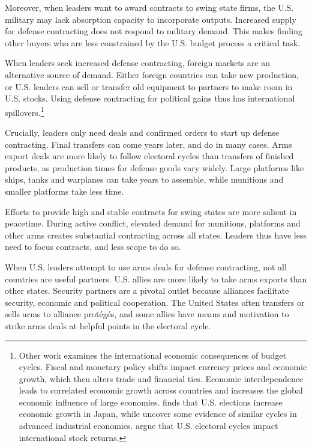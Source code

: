 \documentclass[12pt]{article}
\begin{document}
Moreover, when leaders want to award contracts to swing state firms, the U.S. military may lack absorption capacity to incorporate outputs.
Increased supply for defense contracting does not respond to military demand.
This makes finding other buyers who are less constrained by the U.S. budget process a critical task.


When leaders seek increased defense contracting, foreign markets are an alternative source of demand.
Either foreign countries can take new production, or U.S. leaders can sell or transfer old equipment to partners to make room in U.S. stocks. 
Using defense contracting for political gains thus has international spillovers.\footnote{%
Other work examines the international economic consequences of budget cycles.
Fiscal and monetary policy shifts impact currency prices and economic growth, which then alters trade and financial ties. 
Economic interdependence leads to correlated economic growth across countries \citep{ArtisZhang1999, Kayser2006} and increases the global economic influence of large economies. 
\citet{Ito1991} finds that U.S. elections increase economic growth in Japan, while \citet{ThompsonZuk1983} uncover some evidence of similar cycles in advanced industrial economies.
\citet{FoersterSchmitz1997} argue that U.S. electoral cycles impact international stock returns.
}


Crucially, leaders only need deals and confirmed orders to start up defense contracting. 
Final transfers can come years later, and do in many cases. 
Arms export deals are more likely to follow electoral cycles than transfers of finished products, as production times for defense goods vary widely. 
Large platforms like ships, tanks and warplanes can take years to assemble, while munitions and smaller platforms take less time. 


Efforts to provide high and stable contracts for swing states are more salient in peacetime. 
During active conflict, elevated demand for munitions, platforms and other arms creates substantial contracting across all states. 
Leaders thus have less need to focus contracts, and less scope to do so.   


When U.S. leaders attempt to use arms deals for defense contracting, not all countries are useful partners. 
U.S. allies are more likely to take arms exports than other states. 
Security partners are a pivotal outlet because alliances facilitate security, economic and political cooperation.
The United States often transfers or sells arms to alliance prot{\'e}g{\'e}s, and some allies have means and motivation to strike arms deals at helpful points in the electoral cycle. 
\end{document}
